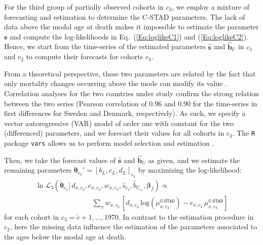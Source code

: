 \documentclass[11pt, a4paper]{article}
\begin{document}
For the third group of partially observed cohorts in $c_3$, we employ a mixture of forecasting and estimation to determine the C-STAD parameters. The lack of data above the modal age at death makes it impossible to estimate the parameter $\bm{s}$ and compute the log-likelihoods in Eq.~(\ref{Eq:loglikeC1}) and (\ref{Eq:loglikeC2}). Hence, we start from the time-series of the estimated parameters $\hat{\bm{s}}$ and $\hat{\bm{b}}_U$ in $c_1$ and $c_2$ to compute their forecasts for cohorts $c_3$. 

From a theoretical perspective, these two parameters are related by the fact that only mortality changes occurring above the mode can modify its value \cite[cf.~Appendix B in][]{canudas2010three}. Correlation analyses for the two countries under study confirm the strong relation between the two series (Pearson correlation of 0.96 and 0.90 for the time-series in first differences for Sweden and Denmark, respectively). As such, we specify a vector autoregressive (VAR) model of order one with constant for the two (differenced) parameters, and we forecast their values for all cohorts in $c_3$. The \texttt{R} package \texttt{vars} allows us to perform model selection and estimation \citep{pfaff2008analysis,pfaff2008var}.

Then, we take the forecast values of $\hat{\bm{s}}$ and $\hat{\bm{b}}_U$ as given, and we estimate the remaining parameters $\breve{\bm{\theta}}_{c_{3}}'=\left[b_{L},c_{L},d_{L}\right]_{c_{3}}$ by maximizing the log-likelihood:
%
\begin{equation}\label{Eq:loglikeC3}
\begin{aligned}
\ln\mathcal{L}_3\left(\breve{\bm{\theta}}_{c_{3}} | \, d_{x,c_{3}} , e_{x,c_{3}} , w_{x,c_{3}} , \hat{s}_{c_{3}}, \hat{b}_{U_{c_{3}}} , \bm{\beta}_{f} \right) \propto \qquad\qquad\qquad\qquad \\ \qquad\qquad\qquad\qquad \sum_{x} w_{x,c_{3}} \, \left[  d_{x,c_{3}} \,
\mathrm{log} \left( \mu^{\texttt{C-STAD}}_{x,c_{3}}  \right) - e_{x,c_{3}}
\, \mu^{\texttt{C-STAD}}_{x,c_{3}} \right] 
\end{aligned}
\end{equation}
%
for each cohort in $c_{3}=\tilde{c}+1,\ldots,1970$. In contrast to the estimation procedure in $c_2$, here the missing data influence the estimation of the parameters associated to the ages below the modal age at death. \par
\end{document}
